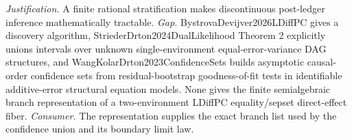 \documentclass{article}
\begin{document}
\par\smallskip\noindent \textit{Justification.} A finite rational stratification makes discontinuous post-ledger inference mathematically tractable. \textit{Gap.} BystrovaDevijver2026LDiffPC gives a discovery algorithm, StriederDrton2024DualLikelihood Theorem 2 explicitly unions intervals over unknown single-environment equal-error-variance DAG structures, and WangKolarDrton2023ConfidenceSets builds asymptotic causal-order confidence sets from residual-bootstrap goodness-of-fit tests in identifiable additive-error structural equation models. None gives the finite semialgebraic branch representation of a two-environment LDiffPC equality/sepset direct-effect fiber. \textit{Consumer.} The representation supplies the exact branch list used by the confidence union and its boundary limit law.
\end{document}
